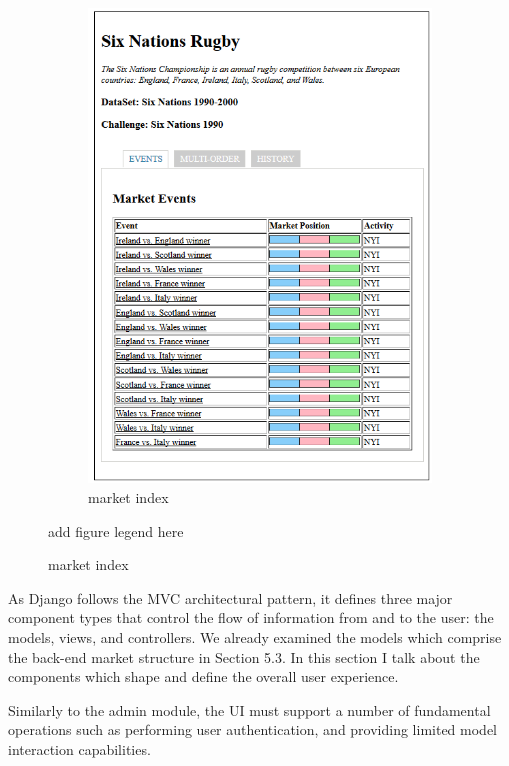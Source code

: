 \documentclass[bsc,frontabs,twoside,singlespacing,parskip,deptreport]{infthesis}     %
\begin{document}
\begin{itemize}
\begin{figure}
\begin{subfigure}{0.6\textwidth}
\includegraphics[width=1\linewidth]{figures/ui-market-index(c).png}
  \caption{market index}
  \label{fig:ui_market_index}
\end{subfigure}
\label{fig:market-list-index}

{add figure legend here}
\end{figure}





	As Django follows the MVC architectural pattern, it defines three major component types that control the flow of information from and to the user: the models, views, and controllers. We already examined the models which comprise the back-end market structure in Section 5.3. In this section I talk about the components which shape and define the overall user experience. 


	Similarly to the admin module, the UI must support a number of fundamental operations such as performing user authentication, and providing limited model interaction capabilities. 



\end{itemize}
\end{document}
